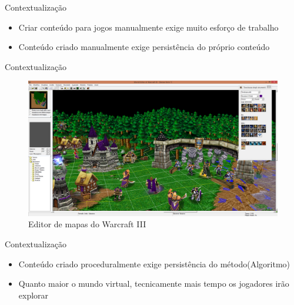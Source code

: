 
\begin{frame}{Contextualização}
  \begin{itemize}
        \item Criar conteúdo para jogos manualmente exige muito esforço de trabalho
        \item Conteúdo criado manualmente exige persistência do próprio conteúdo
    \end{itemize}
\end{frame}

\begin{frame}{Contextualização}
  \begin{figure}
		\centering
        \includegraphics[width=.8\textwidth]{img/intro/World_Editor_di_Warcraft_III.jpg}
        \caption{Editor de mapas do \alert{Warcraft III}}
  \end{figure}
\end{frame}

\begin{frame}{Contextualização}
  \begin{itemize}
        \item Conteúdo criado proceduralmente exige persistência do método(Algoritmo)
        \item Quanto maior o mundo virtual, tecnicamente mais tempo os jogadores irão explorar \cite{bevilacqua2009ferramenta}
    \end{itemize}
\end{frame}


